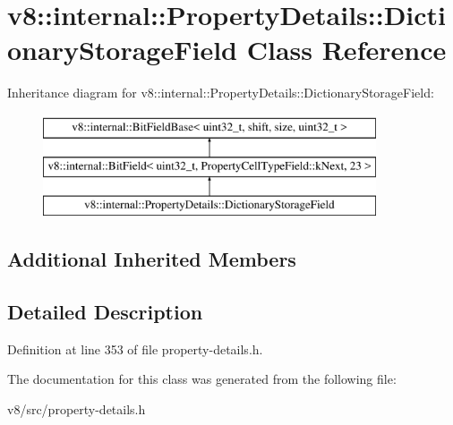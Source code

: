 \hypertarget{classv8_1_1internal_1_1PropertyDetails_1_1DictionaryStorageField}{}\section{v8\+:\+:internal\+:\+:Property\+Details\+:\+:Dictionary\+Storage\+Field Class Reference}
\label{classv8_1_1internal_1_1PropertyDetails_1_1DictionaryStorageField}
Inheritance diagram for v8\+:\+:internal\+:\+:Property\+Details\+:\+:Dictionary\+Storage\+Field\+:\begin{figure}[H]
\begin{center}
\leavevmode
\includegraphics[height=3.000000cm]{classv8_1_1internal_1_1PropertyDetails_1_1DictionaryStorageField}
\end{center}
\end{figure}
\subsection*{Additional Inherited Members}


\subsection{Detailed Description}


Definition at line 353 of file property-\/details.\+h.



The documentation for this class was generated from the following file\+:\begin{DoxyCompactItemize}
\item 
v8/src/property-\/details.\+h\end{DoxyCompactItemize}
